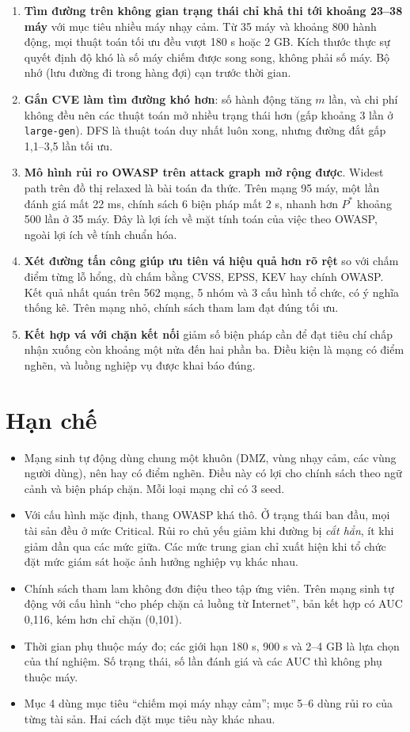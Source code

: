 \documentclass[11pt,a4paper]{article}
\begin{document}
\begin{enumerate}
  \item \textbf{Tìm đường trên không gian trạng thái chỉ khả thi tới khoảng 23--38 máy} với mục tiêu nhiều máy nhạy cảm. Từ 35 máy và khoảng 800 hành động, mọi thuật toán tối ưu đều vượt 180 s hoặc 2 GB. Kích thước thực sự quyết định độ khó là số máy chiếm được song song, không phải số máy. Bộ nhớ (lưu đường đi trong hàng đợi) cạn trước thời gian.
  \item \textbf{Gắn CVE làm tìm đường khó hơn}: số hành động tăng $m$ lần, và chi phí không đều nên các thuật toán mở nhiều trạng thái hơn (gấp khoảng 3 lần ở \texttt{large-gen}). DFS là thuật toán duy nhất luôn xong, nhưng đường đắt gấp 1,1--3,5 lần tối ưu.
  \item \textbf{Mô hình rủi ro OWASP trên attack graph mở rộng được}. Widest path trên đồ thị relaxed là bài toán đa thức. Trên mạng 95 máy, một lần đánh giá mất 22 ms, chính sách 6 biện pháp mất 2 s, nhanh hơn $P^{*}$ khoảng 500 lần ở 35 máy. Đây là lợi ích về mặt tính toán của việc theo OWASP, ngoài lợi ích về tính chuẩn hóa.
  \item \textbf{Xét đường tấn công giúp ưu tiên vá hiệu quả hơn rõ rệt} so với chấm điểm từng lỗ hổng, dù chấm bằng CVSS, EPSS, KEV hay chính OWASP. Kết quả nhất quán trên 562 mạng, 5 nhóm và 3 cấu hình tổ chức, có ý nghĩa thống kê. Trên mạng nhỏ, chính sách tham lam đạt đúng tối ưu.
  \item \textbf{Kết hợp vá với chặn kết nối} giảm số biện pháp cần để đạt tiêu chí chấp nhận xuống còn khoảng một nửa đến hai phần ba. Điều kiện là mạng có điểm nghẽn, và luồng nghiệp vụ được khai báo đúng.
\end{enumerate}

\section{Hạn chế}

\begin{itemize}
  \item Mạng sinh tự động dùng chung một khuôn (DMZ, vùng nhạy cảm, các vùng người dùng), nên hay có điểm nghẽn. Điều này có lợi cho chính sách theo ngữ cảnh và biện pháp chặn. Mỗi loại mạng chỉ có 3 seed.
  \item Với cấu hình mặc định, thang OWASP khá thô. Ở trạng thái ban đầu, mọi tài sản đều ở mức Critical. Rủi ro chủ yếu giảm khi đường bị \emph{cắt hẳn}, ít khi giảm dần qua các mức giữa. Các mức trung gian chỉ xuất hiện khi tổ chức đặt mức giám sát hoặc ảnh hưởng nghiệp vụ khác nhau.
  \item Chính sách tham lam không đơn điệu theo tập ứng viên. Trên mạng sinh tự động với cấu hình ``cho phép chặn cả luồng từ Internet'', bản kết hợp có AUC 0,116, kém hơn chỉ chặn (0,101).
  \item Thời gian phụ thuộc máy đo; các giới hạn 180 s, 900 s và 2--4 GB là lựa chọn của thí nghiệm. Số trạng thái, số lần đánh giá và các AUC thì không phụ thuộc máy.
  \item Mục 4 dùng mục tiêu ``chiếm mọi máy nhạy cảm''; mục 5--6 dùng rủi ro của từng tài sản. Hai cách đặt mục tiêu này khác nhau.
\end{itemize}
\end{document}
